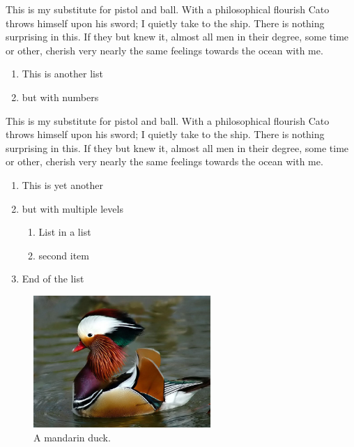 \documentclass[12pt,a4paper]{article}
\begin{document}
This is my substitute for pistol and ball. With a philosophical flourish Cato throws himself upon his sword; I quietly take to the ship. There is nothing surprising in this. If they but knew it, almost all men in their degree, some time or other, cherish very nearly the same feelings towards the ocean with me.

\begin{enumerate}
    \item This is another list
    \item but with numbers
\end{enumerate}

This is my substitute for pistol and ball. With a philosophical flourish Cato throws himself upon his sword; I quietly take to the ship. There is nothing surprising in this. If they but knew it, almost all men in their degree, some time or other, cherish very nearly the same feelings towards the ocean with me.

\begin{enumerate}
    \item This is yet another
    \item but with multiple levels
    \begin{enumerate}
        \item List in a list
        \item second item
    \end{enumerate}
    \item End of the list
\end{enumerate}


\begin{figure}
    \centering
    \includegraphics[width=0.6\textwidth]{mandarin_duck.jpg}
    \caption{A mandarin duck.}
    \label{f:duck}
\end{figure}
\end{document}
